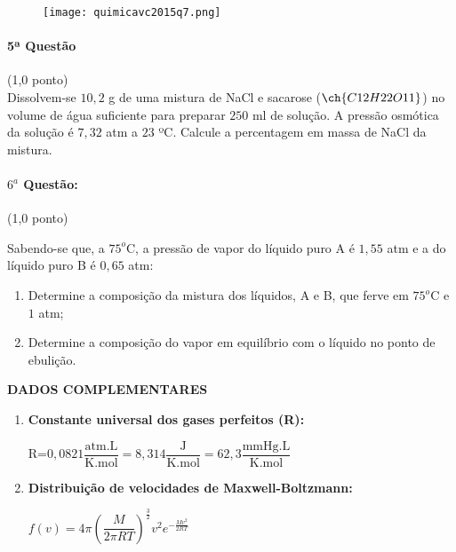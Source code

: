 \documentclass[12pt,a4paper]{article}
\begin{document}
\begin{figure}[h]
\centering
\texttt{[image: quimicavc2015q7.png]}
\end{figure}


\paragraph{5ª Questão} (1,0 ponto)\\
Dissolvem-se $10,2$ g de uma mistura de NaCl e sacarose ($\ch{C12H22O11}$) no volume de água suficiente para preparar $250$ ml de solução. A pressão osmótica da solução é $7,32$ atm a $23$ ºC. Calcule a percentagem em massa de NaCl da mistura.

\paragraph{$6^a$ Questão:} (1,0 ponto)

Sabendo-se que, a $75^o$C, a pressão de vapor do líquido puro A é $1,55$ atm e a do líquido puro B é $0,65$ atm:
\begin{enumerate}[label=\alph*)]
\item Determine a composição da mistura dos líquidos, A e B, que ferve em $75^o$C e $1$ atm;
\item Determine a composição do vapor em equilíbrio com o líquido no ponto de ebulição.
\end{enumerate}

\newpage

 \begin{center}
 \textbf{DADOS COMPLEMENTARES}
 \end{center}
 
 \begin{enumerate}[label=\Roman*.]
 \item \textbf{Constante universal dos gases perfeitos (R):} 
 
 \vspace{0.2cm}
 R=$0,0821 \dfrac{\textrm{atm.L}}{\textrm{K.mol}}=8,314 \dfrac{\textrm{J}}{\textrm{K.mol}}=62,3 \dfrac{\textrm{mmHg.L}}{\textrm{K.mol}}$
\vspace{0.3cm} 

\item \textbf{Distribuição de velocidades de Maxwell-Boltzmann:}

$f(v)=4\pi \left( \dfrac{M}{2\pi RT} \right)^{\frac{3}{2}} v^2 e^{-\frac{Mv^2}{2RT}}$ 
\end{enumerate}
\newpage
\end{document}

